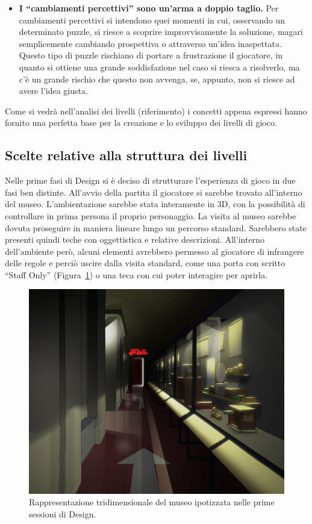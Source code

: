 \begin{itemize}
	\item \textbf{I “cambiamenti percettivi” sono un’arma a doppio taglio.} Per cambiamenti percettivi si intendono quei momenti in cui, osservando un determinato puzzle, si riesce a scoprire improvvisamente la soluzione, magari semplicemente cambiando prospettiva o attraverso un’idea inaspettata. Questo tipo di puzzle rischiano di portare a frustrazione il giocatore, in quanto si ottiene una grande soddisfazione nel caso si riesca a risolverlo, ma c’è un grande rischio che questo non avvenga, se, appunto, non si riesce ad avere l’idea giusta.
\end{itemize}

Come si vedrà nell’analisi dei livelli (riferimento) i concetti appena espressi hanno fornito una perfetta base per la creazione e lo sviluppo dei livelli di gioco.

\subsection{Scelte relative alla struttura dei livelli}
\label{sec:struttura_livelli}

Nelle prime fasi di Design si è deciso di strutturare l’esperienza di gioco in due fasi ben distinte. All’avvio della partita il giocatore si sarebbe trovato all’interno del museo. L’ambientazione sarebbe stata interamente in 3D, con la possibilità di controllare in prima persona il proprio personaggio. La visita al museo sarebbe dovuta proseguire in maniera lineare lungo un percorso standard. Sarebbero state presenti quindi teche con oggettistica e relative descrizioni.
All’interno dell’ambiente però, alcuni elementi avrebbero permesso al giocatore di infrangere delle regole e perciò uscire dalla visita standard, come una porta con scritto “Staff Only” (Figura~\ref{fig:level_design_staffonly}) o una teca con cui poter interagire per aprirla.

\begin{figure}%
	\centering
	\includegraphics[width= 0.8\columnwidth]{images/gameDesign/37_museo3d.jpg}
	\caption{Rappresentazione tridimensionale del museo ipotizzata nelle prime sessioni di Design.}
	\label{fig:level_design_staffonly}
\end{figure}

